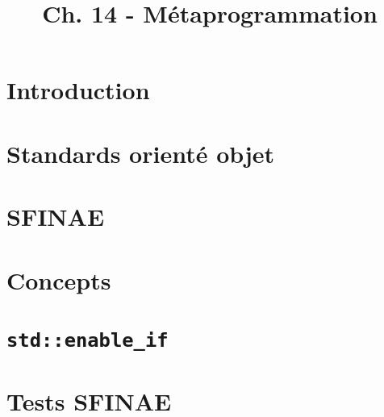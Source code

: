 


\title{Ch. 14 - Métaprogrammation}




\section{Introduction}

\section{Standards orienté objet}

\section{SFINAE}

\section{Concepts}

\section{\texttt{std::enable\_if}}

\section{Tests SFINAE}


